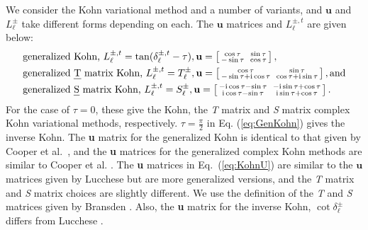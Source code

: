 \documentclass[preprint,showpacs,showkeys,preprintnumbers,amsmath,amssymb,longbibliography,pra,aps]{revtex4-1}
\newcommand{\ii}{{\rm{i}}}
\begin{document}
We consider the Kohn variational method and a number of variants,
and $\textbf{u}$ and $L^{\pm}_\ell$ take
different forms depending on each. The $\textbf{u}$ matrices and
$L^{\pm,t}_\ell$ are given below:
\begin{subequations}
\label{eq:KohnU}
\begin{align}
&\text{generalized Kohn, } L^{\pm,t}_\ell = \tan(\delta^{\pm,t}_\ell-\tau),
 \textbf{u} = \left[ \begin{smallmatrix}
\cos \tau & \ \sin \tau \\  -\sin \tau & \  \cos \tau
\end{smallmatrix} \right], \label{eq:GenKohn}\\
&\text{generalized \emph{T} matrix Kohn, } L^{\pm,t}_\ell = T_\ell^{\pm},
 \textbf{u} = \left[ \begin{smallmatrix}
\cos\tau & \ \sin\tau \\ -\sin\tau + \ii \cos\tau & \ \cos\tau + \ii \sin\tau
\end{smallmatrix} \right], \text{and}\label{eq:GenTKohn} \\
&\text{generalized \emph{S} matrix Kohn, } L^{\pm,t}_\ell = S_\ell^{\pm},
 \textbf{u} = \left[ \begin{smallmatrix}
-\ii \cos\tau - \sin\tau & \ -\ii\sin\tau + \cos\tau \\ 
 \ii\cos\tau - \sin\tau & \ \ii\sin\tau + \cos\tau
\end{smallmatrix} \right]. \label{eq:GenSKohn}
\end{align}
\end{subequations}
For the case of $\tau = 0$, these give the Kohn, the \emph{T} matrix and
\emph{S} matrix complex Kohn variational methods, respectively.
$\tau = \frac{\pi}{2}$ in Eq. (\ref{eq:GenKohn})
gives the inverse Kohn. 
The \textbf{u} matrix for the generalized Kohn is identical to that given by
Cooper et al.\ \cite{Cooper2010}, and the \textbf{u} matrices for the
generalized complex Kohn methods are similar to Cooper et al. \cite{Cooper2010}.
The \textbf{u} matrices in Eq.~(\ref{eq:KohnU}) are similar to the
$\textbf{u}$ matrices given by Lucchese \cite{Lucchese1989} but are more 
generalized versions, and the \emph{T} matrix and \emph{S} matrix choices are 
slightly different. We use the definition of the \emph{T} and \emph{S} matrices
given by Bransden \cite{Bransden2003}.
Also, the \textbf{u} matrix for the inverse Kohn,
$\cot\delta_\ell^\pm$ differs from Lucchese \cite{Lucchese1989}.
\end{document}
